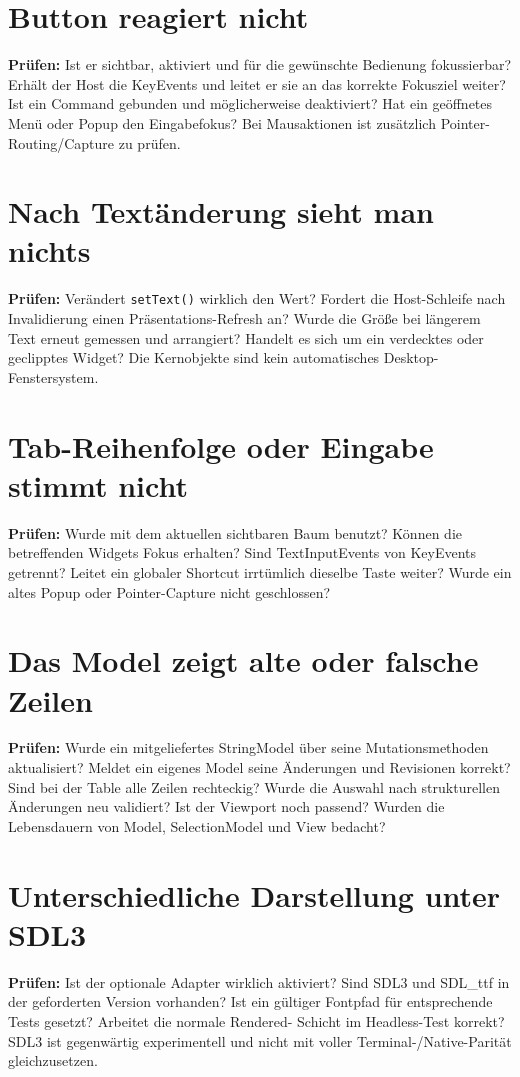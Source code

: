 \section{Button reagiert nicht}
\textbf{Prüfen:} Ist er sichtbar,
aktiviert und für die gewünschte
Bedienung fokussierbar?
Erhält der Host die KeyEvents
und leitet er sie an das korrekte
Fokusziel weiter?
Ist ein Command gebunden und
möglicherweise deaktiviert?
Hat ein geöffnetes Menü oder
Popup den Eingabefokus?
Bei Mausaktionen ist zusätzlich
Pointer-Routing/Capture zu prüfen.

\section{Nach Textänderung sieht man nichts}
\textbf{Prüfen:} Verändert
\texttt{setText()} wirklich den
Wert? Fordert die Host-Schleife
nach Invalidierung einen
Präsentations-Refresh an?
Wurde die Größe bei längerem
Text erneut gemessen und
arrangiert?
Handelt es sich um ein
verdecktes oder geclipptes Widget?
Die Kernobjekte sind kein
automatisches Desktop-Fenstersystem.

\section{Tab-Reihenfolge oder Eingabe stimmt nicht}
\textbf{Prüfen:} Wurde
 mit
dem aktuellen sichtbaren Baum
benutzt? Können die betreffenden
Widgets Fokus erhalten?
Sind TextInputEvents von
KeyEvents getrennt?
Leitet ein globaler Shortcut
irrtümlich dieselbe Taste weiter?
Wurde ein altes Popup oder
Pointer-Capture nicht geschlossen?

\section{Das Model zeigt alte oder falsche Zeilen}
\textbf{Prüfen:} Wurde ein
mitgeliefertes StringModel über
seine Mutationsmethoden
aktualisiert? Meldet ein
eigenes Model seine Änderungen
und Revisionen korrekt?
Sind bei der Table alle Zeilen
rechteckig? Wurde
die Auswahl nach strukturellen
Änderungen neu validiert?
Ist der Viewport noch passend?
Wurden die Lebensdauern von Model,
SelectionModel und View bedacht?

\section{Unterschiedliche Darstellung unter SDL3}
\textbf{Prüfen:} Ist der
optionale Adapter wirklich aktiviert?
Sind SDL3 und SDL\_ttf in der
geforderten Version vorhanden?
Ist ein gültiger Fontpfad
für entsprechende Tests gesetzt?
Arbeitet die normale Rendered-
Schicht im Headless-Test korrekt?
SDL3 ist gegenwärtig
experimentell und nicht mit
voller Terminal-/Native-Parität
gleichzusetzen.

